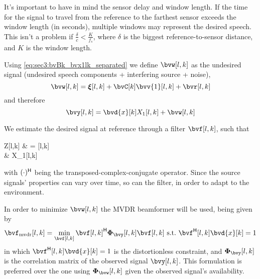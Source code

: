 It's important to have in mind the sensor delay and window length. If the time for the signal to travel from the reference to the farthest sensor exceeds the window length (in seconds), multiple windows may represent the desired speech. This isn't a problem if $\frac{\delta}{c} < \frac{K}{f_s}$, where $\delta$ is the biggest reference-to-sensor distance, and $K$ is the window length.

Using \cref{eq:sec3:bvBk_bvx1lk_separated} we define $\bvw[l,k]$ as the undesired signal (undesired speech components + interfering source + noise),
\begin{equation}
	\label{eq:sec3:def_undes_sig_bvwlk}
	\bvw[l,k] = \bvxi[l,k] + \bvC[k] \bvv{1}[l,k] + \bvr[l,k]
\end{equation}
and therefore
\begin{equation}
    \label{eq:sec3:time-freq_model_final}
	\bvy[l,k] = \bvd{x}[k] X_1[l,k] + \bvw[l,k]
\end{equation}


We estimate the desired signal at reference through a filter $\bvf[l,k]$, such that
\begin{equations}
	Z[l,k]
	& = \he{\bvf}[l,k] \bvy[l,k] \\
	& \approx X_1[l,k]
\end{equations}
with $(\cdot)^{\mathsf{H}}$ being the transposed-complex-conjugate operator. Since the source signals' properties can vary over time, so can the filter, in order to adapt to the environment.

In order to minimize $\bvw[l,k]$ the MVDR beamformer \cite{erdogan_improved_2016} will be used, being given by
\begin{equation}
	\label{eq:sec3:minimization_problem_mvdr}
	\bvf_{\mvdr}[l,k] = \min_{\bvf[l,k]} \he{\bvf[l,k]} \Corr{\bvy}[l,k] \bvf[l,k]~\text{s.t.}~\he{\bvf}[l,k] \bvd{x}[k] = 1
\end{equation}
in which $\he{\bvf}[l,k] \bvd{x}[k] = 1$ is the distortionless constraint, and $\Corr{\bvy}[l,k]$ is the correlation matrix of the observed signal $\bvy[l,k]$. This formulation is preferred over the one using $\Corr{\bvw}[l,k]$ given the observed signal's availability.

